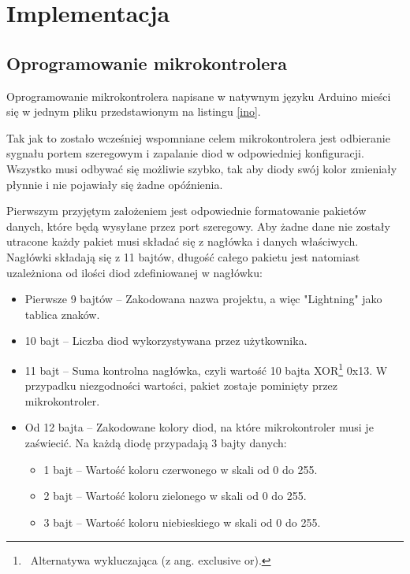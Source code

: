 \documentclass[12pt]{report}
\begin{document}
\vfill
\clearpage

\section{Implementacja}

\subsection{Oprogramowanie mikrokontrolera}

Oprogramowanie mikrokontrolera napisane w natywnym języku Arduino mieści się w jednym pliku przedstawionym na listingu \ref{ino}.

 \label{ino}

Tak jak to zostało wcześniej wspomniane celem mikrokontrolera jest odbieranie sygnału portem szeregowym i zapalanie diod w odpowiedniej konfiguracji. Wszystko musi odbywać się możliwie szybko, tak aby diody swój kolor zmieniały płynnie i nie pojawiały się żadne opóźnienia.

Pierwszym przyjętym założeniem jest odpowiednie formatowanie pakietów danych, które będą wysyłane przez port szeregowy. Aby żadne dane nie zostały utracone każdy pakiet musi składać się z nagłówka i danych właściwych. Nagłówki składają się z 11 bajtów, długość całego pakietu jest natomiast uzależniona od ilości diod zdefiniowanej w nagłówku:

\begin{itemize}
	\item Pierwsze 9 bajtów -- Zakodowana nazwa projektu, a więc "Lightning" jako tablica znaków.
	\item 10 bajt -- Liczba diod wykorzystywana przez użytkownika.
	\item 11 bajt -- Suma kontrolna nagłówka, czyli wartość 10 bajta XOR\footnote{~Alternatywa wykluczająca (z ang. exclusive or).} 0x13. W przypadku niezgodności wartości, pakiet zostaje pominięty przez mikrokontroler.
	\item Od 12 bajta -- Zakodowane kolory diod, na które mikrokontroler musi je zaświecić. Na każdą diodę przypadają 3 bajty danych:
	\begin{itemize}
		\item 1 bajt -- Wartość koloru czerwonego w skali od 0 do 255.
		\item 2 bajt -- Wartość koloru zielonego w skali od 0 do 255.
		\item 3 bajt -- Wartość koloru niebieskiego w skali od 0 do 255.
	\end{itemize}
\end{itemize}
\end{document}
